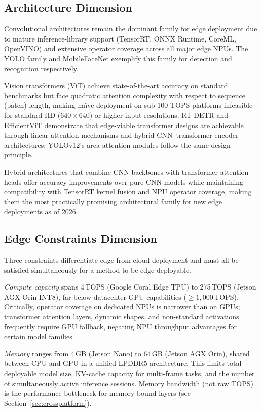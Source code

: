 \documentclass[11pt,a4paper]{article}
\begin{document}
\subsection{Architecture Dimension}
\label{subsec:tax_arch}

Convolutional architectures remain the dominant family for edge
deployment due to mature inference-library support (TensorRT, ONNX
Runtime, CoreML, OpenVINO) and extensive operator coverage across all
major edge NPUs. The YOLO family and MobileFaceNet exemplify this
family for detection and recognition respectively.

Vision transformers (ViT) achieve state-of-the-art accuracy on
standard benchmarks but face quadratic attention complexity with
respect to sequence (patch) length, making na\"{i}ve deployment on
sub-100-TOPS platforms infeasible for standard HD ($640{\times}640$)
or higher input resolutions. RT-DETR and EfficientViT demonstrate
that edge-viable transformer designs are achievable through linear
attention mechanisms and hybrid CNN--transformer encoder architectures;
YOLOv12's area attention modules follow the same design principle.

Hybrid architectures that combine CNN backbones with transformer
attention heads offer accuracy improvements over pure-CNN models while
maintaining compatibility with TensorRT kernel fusion and NPU operator
coverage, making them the most practically promising architectural
family for new edge deployments as of 2026.

\subsection{Edge Constraints Dimension}
\label{subsec:tax_constraints}

Three constraints differentiate edge from cloud deployment and must
all be satisfied simultaneously for a method to be edge-deployable.

\textit{Compute capacity} spans 4\,TOPS (Google Coral Edge TPU) to
275\,TOPS (Jetson AGX Orin INT8), far below datacenter GPU capabilities
($\geq 1{,}000$\,TOPS). Critically, operator coverage on dedicated
NPUs is narrower than on GPUs; transformer attention layers, dynamic
shapes, and non-standard activations frequently require GPU fallback,
negating NPU throughput advantages for certain model families.

\textit{Memory} ranges from 4\,GB (Jetson Nano) to 64\,GB (Jetson
AGX Orin), shared between CPU and GPU in a unified LPDDR5 architecture.
This limits total deployable model size, KV-cache capacity for
multi-frame tasks, and the number of simultaneously active inference
sessions. Memory bandwidth (not raw TOPS) is the performance bottleneck
for memory-bound layers (see Section~\ref{sec:crossplatform}).
\end{document}
